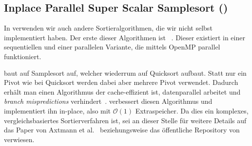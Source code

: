 \subsection{Inplace Parallel Super Scalar Samplesort (\ipsviero)}
\label{section:ips4o}

In \sacabench verwenden wir auch andere Sortieralgorithmen, die wir nicht selbst implementiert haben.
Der erste dieser Algorithmen ist \ipsviero~\cite{axtmann2017}.
Dieser existiert in einer sequentiellen und einer parallelen Variante,
die mittels OpenMP parallel funktioniert.

\ipsviero baut auf Samplesort auf, welcher wiederrum auf Quicksort aufbaut.
Statt nur ein Pivot wie bei Quicksort werden dabei aber mehrere Pivot verwendet.
Dadurch erhält man einen Algorithmus \glqq der cache-effizient ist, datenparallel arbeitet und \emph{branch mispredictions} verhindert\grqq~\cite{axtmann2017}.
\ipsviero verbessert diesen Algorithmus und implementiert ihn in-place, also mit $\mathcal O(1)$ Extraspeicher.
Da dies ein komplexes, vergleichsbasiertes Sortierverfahren ist,
sei an dieser Stelle für weitere Details auf das Paper von Axtmann et al.~\cite{axtmann2017}
beziehungsweise das öffentliche Repository von \ipsviero~\cite{ips4o:repo} verwiesen.